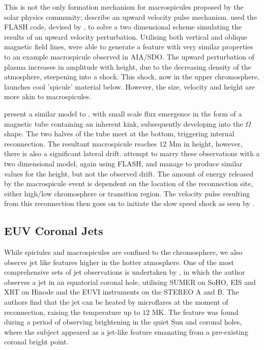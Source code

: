This is not the only formation mechanism for macrospicules proposed by the solar physics community; \cite{Murawski2011} describe an upward velocity pulse mechanism.
\cite{Murawski2011} used the FLASH code, devised by \cite{Lee2009}, to solve a two dimensional scheme simulating the results of an upward velocity perturbation.
Utilising both vertical and oblique magnetic field lines, \cite{Murawski2011} were able to generate a feature with very similar properties to an example macrospicule observed in AIA/SDO.
The upward perturbation of plasma increases in amplitude with height, due to the decreasing density of the atmosphere, steepening into a shock.
This shock, now in the upper chromosphere, launches cool 'spicule' material below.
However, the size, velocity and height are more akin to macrospicules.

\cite{Kayshap2013} present a similar model to \cite{Archontis2005}, with small scale flux emergence in the form of a magnetic tube containing an inherent kink, subsequently developing into the $\Omega$ shape.
The two halves of the tube meet at the bottom, triggering internal reconnection.
The resultant macrospicule reaches $12$ Mm in height, however, there is also a significant lateral drift.
\cite{Kayshap2013} attempt to marry these observations with a two dimensional model, again using FLASH, and manage to produce similar values for the height, but not the observed drift.
The amount of energy released by the macrospicule event is dependent on the location of the reconnection site, either high/low chromosphere or transition region.
The velocity pulse resulting from this reconnection then goes on to initiate the slow speed shock as seen by \cite{Murawski2011}.


\subsection{EUV Coronal Jets}
While spiciules and macrospicules are confined to the chromosphere, we also observe jet like features higher in the hotter atmosphere.
One of the most comprehensive sets of jet observations is undertaken by \cite{Majarska2011}, in which the author observes a jet in an equatorial coronal hole, utilising SUMER on SoHO, EIS and XRT on Hinode and the EUVI instruments on the STEREO A and B.
The authors find that the jet can be heated by microflares at the moment of reconnection, raising the temperature up to $12$ MK.
The feature was found during a period of observing brightening in the quiet Sun and coronal holes, where the subject appeared as a jet-like feature emanating from a pre-existing coronal bright point.

